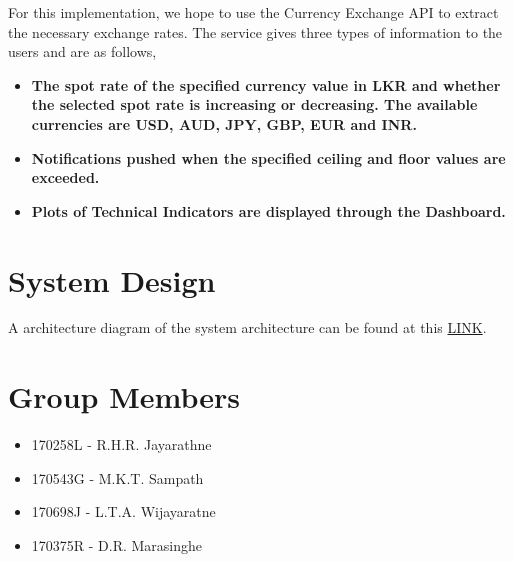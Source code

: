 For this implementation, we hope to use the Currency Exchange API to extract the necessary exchange rates. The service gives three types of information to the users and are as follows,

\begin{itemize}





\item \textbf{The spot rate of the specified currency value in LKR and whether the selected spot rate is increasing or decreasing. The available currencies are USD, AUD, JPY, GBP, EUR and INR.}
\item \textbf{Notifications pushed when the specified ceiling and floor values are exceeded.}
\item \textbf{Plots of Technical Indicators are displayed through the Dashboard.}




\end{itemize}


\section{System Design}

A architecture diagram of the system architecture can be found at this \href{https://drive.google.com/file/d/1TJLkz44PTER5wlyw7kqzVCokANtGV_jx/view?usp=sharing}{LINK}.

\section{Group Members}

\begin{itemize}
\setlength\itemsep{0.3em}
\item 170258L - R.H.R. Jayarathne
\item 170543G - M.K.T. Sampath
\item 170698J - L.T.A. Wijayaratne
\item 170375R - D.R. Marasinghe

\end{itemize}

